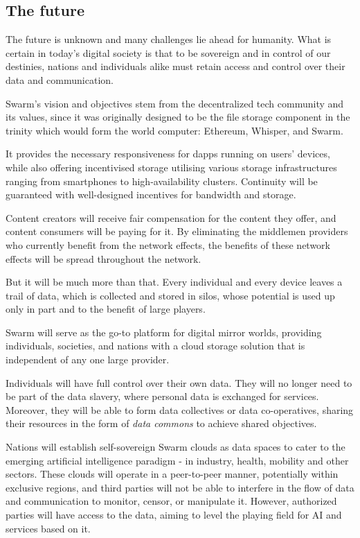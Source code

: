 \subsection{The future} \label{sec:future}

The future is unknown and many challenges lie ahead for humanity. What is certain in today's digital society is that to be sovereign and in control of our destinies, nations and individuals alike must retain access and control over their data and communication.

Swarm's vision and objectives stem from the decentralized tech community and its values, since it was originally designed to be the file storage component in the trinity which would form the world computer: Ethereum, Whisper, and Swarm.

It provides the necessary responsiveness for dapps running on users' devices, while also offering incentivised storage utilising various storage infrastructures ranging from smartphones to high-availability clusters. Continuity will be guaranteed with well-designed incentives for bandwidth and storage.

Content creators will receive fair compensation for the content they offer, and content consumers will be paying for it. By eliminating the middlemen providers who currently benefit from the network effects, the benefits of these network effects will be spread throughout the network.

But it will be much more than that. Every individual and every device leaves a trail of data, which is collected and stored in silos, whose potential is used up only in part and to the benefit of large players.

Swarm will serve as the go-to platform for digital mirror worlds, providing individuals, societies, and nations with a cloud storage solution that is independent of any one large provider. 


Individuals will have full control over their own data. They will no longer need to be part of the data slavery, where personal data is exchanged for services. Moreover, they will be able to form data collectives or data co-operatives, sharing their resources in the form of \emph{data commons} to achieve shared objectives. 

Nations will establish self-sovereign Swarm clouds as data spaces to cater to the emerging artificial intelligence paradigm - in industry, health, mobility and other sectors. These clouds will operate in a peer-to-peer manner, potentially within exclusive regions, and third parties will not be able to interfere in the flow of data and communication to monitor, censor,  or manipulate it. However, authorized parties will have access to the data, aiming to level the playing field for AI and services based on it.  

